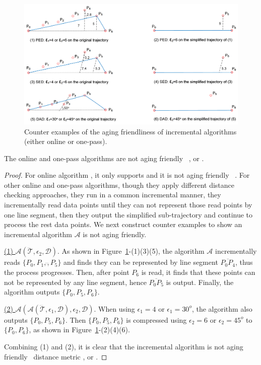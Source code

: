 	
\begin{figure}[tb!]
	\centering
	\includegraphics[scale=0.66]{Figures/Fig-aging-incre.png}
	
	\caption{\small Counter examples of the aging friendliness of incremental algorithms (either online or one-pass).}
	\vspace{-2ex}
	\label{fig:aging-incre}
\end{figure}

\begin{theorem}
	\label{theo-aging-online}
	The online and one-pass algorithms are not aging friendly \wrt~\ped, \sed or \dad.

\end{theorem}

\begin{proof}
	For online algorithm \squishe, it only supports \sed and it is not aging friendly \wrt~\sed.
	For other online and one-pass algorithms, though they apply different distance checking approaches, they run in a common incremental manner, \ie they incrementally read data points until they can not represent those read points by one line segment, then they output the simplified sub-trajectory and continue to process the rest data points. We next construct counter examples to show an incremental algorithm $\mathcal{A}$ is not aging friendly.
	
	\underline{(1) ${\mathcal{A}}(\dddot{\mathcal{T}}, \epsilon_2, \mathcal{D})$}. As shown in Figure~\ref{fig:aging-incre}-(1)(3)(5), the algorithm $\mathcal{A}$ incrementally reads $\{P_0, P_1,\dddot, P_5\}$ and finds they can be represented by line segment $\overline{P_0P_4}$, thus the process progresses. Then, after point $P_6$ is read, it finds that these points can not be represented by any line segment, hence $\overline{P_0P_5}$ is output. Finally, the algorithm outputs $\{P_0, P_5, P_6\}$.
	
	\underline{(2) ${\mathcal{A}}(\mathcal{A}(\dddot{\mathcal{T}}, \epsilon_1, \mathcal{D}), \epsilon_2, \mathcal{D})$}. When using $\epsilon_1=4$ or $\epsilon_1=30^o $, the algorithm also outputs $\{P_0, P_5, P_6\}$. Then $\{P_0, P_5, P_6\}$ is compressed using $\epsilon_2=6$ or $\epsilon_2=45^o$ to $\{P_0, P_6\}$, as shown in Figure~\ref{fig:aging-incre}-(2)(4)(6).
	
	Combining (1) and (2), it is clear that the incremental algorithm is not aging friendly \wrt~distance metric \ped, \sed or \dad.
\end{proof}

